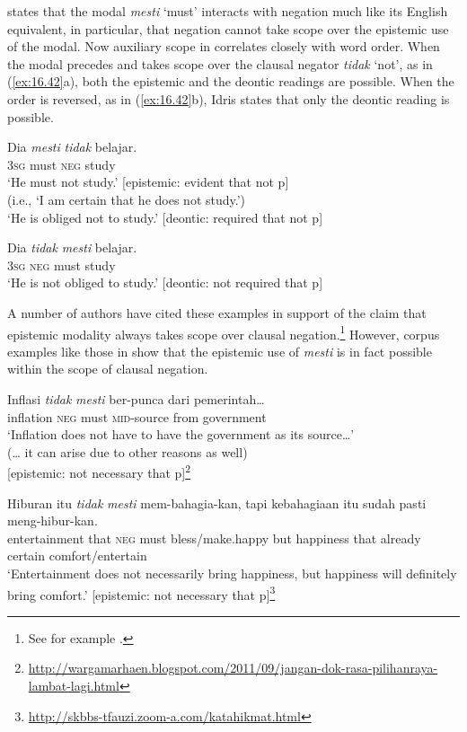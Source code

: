 \citet{Idris1980} states that the  modal \textit{mesti} ‘must’ interacts with negation much like its English equivalent, in particular, that negation cannot take scope over the epistemic use of the modal. Now auxiliary scope in  correlates closely with word order. When the modal precedes and takes scope over the clausal negator \textit{tidak} ‘not’, as in (\ref{ex:16.42}a), both the epistemic and the deontic readings are possible. When the order is reversed, as in (\ref{ex:16.42}b), Idris states that only the deontic reading is possible.


\ea \label{ex:16.42}
\ea  \gll Dia  \textit{mesti}  \textit{tidak}  belajar.\\
\textsc{3sg}  must  \textsc{neg}  study\\
\glt ‘He must not study.’  \hfill [epistemic: evident that not p] \\
\hspace{1cm} (i.e., ‘I am certain that he does not study.’) \\
‘He is obliged not to study.’  \hfill [deontic: required that not p]

\ex \gll Dia  \textit{tidak}  \textit{mesti}  belajar.\\
\textsc{3sg}  \textsc{neg}  must  study\\
\glt ‘He is not obliged to study.’ \hfill [deontic: not required that p]
\z \z


A number of authors have cited these examples in support of the claim that epistemic modality always takes scope over clausal negation.\footnote{See for example \citet{deHaan1997,Drubig2001}.} However, corpus examples like those in  show that the epistemic use of \textit{mesti} is in fact possible within the scope of clausal negation.


\ea \label{ex:16.43}
\ea  \gll Inflasi  \textit{tidak}  \textit{mesti}  ber-punca  dari  pemerintah…\\
inflation  \textsc{neg}  must  \textsc{mid}-source  from  government\\
\glt ‘Inflation does not have to have the government as its source…’\\
(… it can arise due to other reasons as well) \\ \hfill  [epistemic: not necessary that p]\footnote{\url{http://wargamarhaen.blogspot.com/2011/09/jangan-dok-rasa-pilihanraya-lambat-lagi.html}}

\ex 
\gll  Hiburan  itu  \textit{tidak}  \textit{mesti}  mem-bahagia-kan,  tapi kebahagiaan  itu  sudah  pasti  meng-hibur-kan.\\
entertainment  that  \textsc{neg}  must  bless/make.happy  but happiness  that  already  certain  comfort/entertain\\
\glt ‘Entertainment does not necessarily bring happiness, but happiness will definitely bring comfort.’ \hfill  [epistemic: not necessary that p]\footnote{\url{http://skbbs-tfauzi.zoom-a.com/katahikmat.html}}
\z
\z

